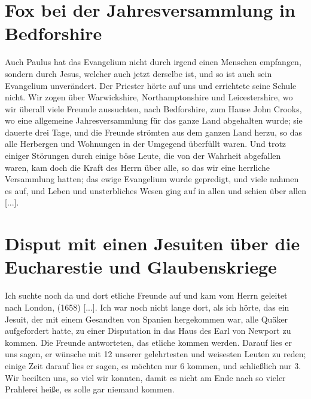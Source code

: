 \section{Fox bei der Jahresversammlung in Bedforshire}

Auch Paulus hat das Evangelium nicht durch irgend einen
Menschen empfangen, sondern durch Jesus, welcher auch jetzt
derselbe ist, und so ist auch sein Evangelium unverändert. Der
Priester hörte auf uns und errichtete seine Schule nicht.
Wir zogen über Warwickshire, 
Northamptonshire und
Leicestershire, wo wir überall viele Freunde 
aussuchten, nach Bedforshire, zum Hause 
John Crooks, wo eine allgemeine 
Jahresversammlung für das ganze 
Land abgehalten wurde; sie dauerte
drei Tage, und die Freunde strömten aus dem ganzen Land herzu,
so das alle Herbergen und Wohnungen in der Umgegend überfüllt 
waren. Und trotz einiger Störungen durch einige böse Leute,
die von der Wahrheit abgefallen waren, kam doch die Kraft des
Herrn über alle, so das wir eine herrliche Versammlung hatten;
das ewige Evangelium wurde gepredigt, und viele nahmen es
auf, und Leben und unsterbliches Wesen ging auf in allen und
schien über allen [...].

\section{Disput mit einen Jesuiten über die Eucharestie und Glaubenskriege}

Ich suchte noch da und dort etliche Freunde auf und kam
vom Herrn geleitet nach London, (1658) [...].
Ich war noch nicht lange dort, als ich hörte, das 
ein Jesuit,
der mit einem Gesandten von Spanien hergekommen war, alle
Quäker aufgefordert hatte, zu einer Disputation 
in das Haus des Earl von Newport 
zu kommen. Die Freunde antworteten, das
etliche kommen werden. Darauf lies er uns sagen, er wünsche
mit 12 unserer gelehrtesten und weisesten Leuten zu reden; einige
Zeit darauf lies er sagen, es möchten nur 6 kommen, und schließlich
nur 3. Wir beeilten uns, so viel wir konnten, damit es nicht am
Ende nach so vieler Prahlerei heiße, es solle gar niemand kommen.



